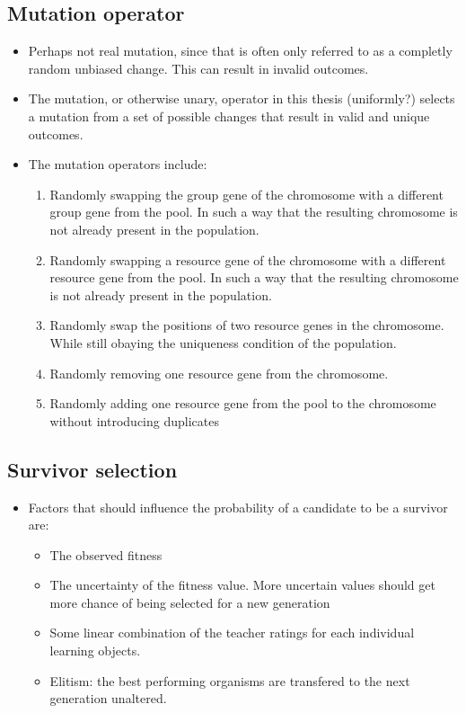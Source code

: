 \subsection{Mutation operator}
\label{sec:approach_mutation_operator}
\begin{itemize}
	\item Perhaps not real mutation, since that is often only referred to as a
		completly random unbiased change. This can result in invalid outcomes.
	\item The mutation, or otherwise unary, operator in this thesis
		(uniformly?) selects a mutation from a set of possible changes that result
		in valid and unique outcomes.
	\item The mutation operators include:
		\begin{enumerate}
			\item Randomly swapping the group gene of the chromosome with a
				different group gene from the pool. In such a way that the
				resulting chromosome is not already present in the population.
			\item Randomly swapping a resource gene of the chromosome with a
				different resource gene from the pool. In such a way that the
				resulting chromosome is not already present in the population.
			\item Randomly swap the positions of two resource genes in the
				chromosome. While still obaying the uniqueness condition of the
				population.
			\item Randomly removing one resource gene from the chromosome.
			\item Randomly adding one resource gene from the pool to the
				chromosome without introducing duplicates
		\end{enumerate}
\end{itemize}
\subsection{Survivor selection}
\label{sec:approach_survivor_selection}
\begin{itemize}
	\item Factors that should influence the probability of a candidate to be a
		survivor are:
		\begin{itemize}
			\item The observed fitness
			\item The uncertainty of the fitness value. More uncertain values
				should get more chance of being selected for a new generation
			\item Some linear combination of the teacher ratings for each
				individual learning objects.
			\item Elitism: the best performing organisms are transfered to the next generation unaltered.
		\end{itemize}
\end{itemize}
